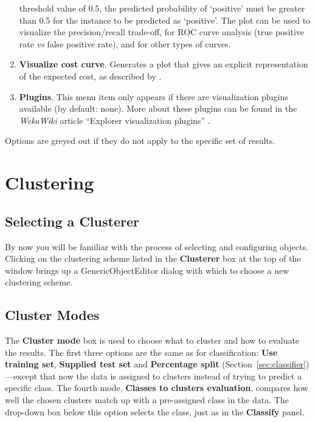 \begin{enumerate}
threshold value of 0.5, the predicted probability of `positive' must be greater
than 0.5 for the instance to be predicted as `positive'. The plot can be used
to visualize the precision/recall trade-off, for ROC curve analysis (true
positive rate {\em vs} false positive rate), and for other types of curves. 
\item \textbf{Visualize cost curve}.
Generates a plot that gives an explicit representation of the expected cost, as
described by \cite{drummond}.
\item \textbf{Plugins}.
This menu item only appears if there are visualization plugins
available (by default: none). More about these plugins can be found in the 
\textit{WekaWiki} article ``Explorer visualization plugins'' \cite{explorervisplugins}.
\end{enumerate}
\noindent
Options are greyed out if they do not apply to the specific set of results.

\newpage

\section{Clustering}

\begin{center}
\end{center}

\subsection{Selecting a Clusterer}

By now you will be familiar with the process of selecting and configuring
objects.  Clicking on the clustering scheme listed in the \textbf{Clusterer}
box at the top of the window brings up a GenericObjectEditor dialog with which
to choose a new clustering scheme.

\subsection{Cluster Modes}

The \textbf{Cluster mode} box is used to choose what to cluster and how to
evaluate the results. The first three options are the same as for
classification: \textbf{Use training set}, \textbf{Supplied test set} and
\textbf{Percentage split} (Section~\ref{sec:classifier})---except that now the
data is assigned to clusters instead of trying to predict a specific class.
The fourth mode, \textbf{Classes to clusters evaluation}, compares how well the
chosen clusters match up with a pre-assigned class in the data.  The drop-down
box below this option selects the class, just as in the \textbf{Classify}
panel.

